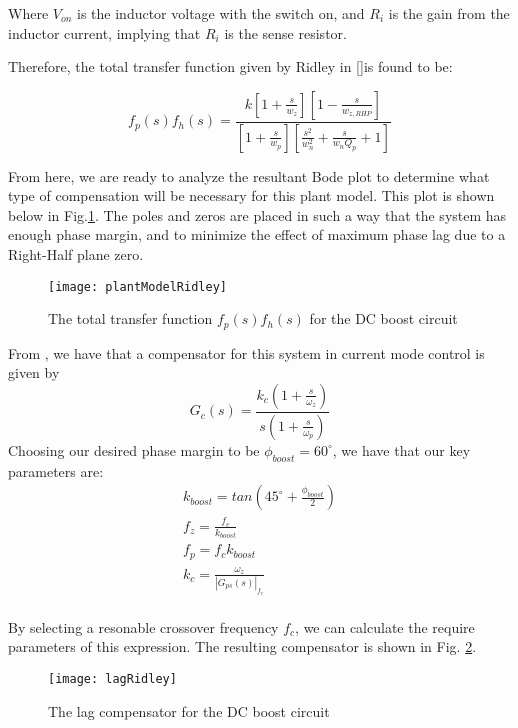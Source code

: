 Where $V_{on}$ is the inductor voltage with the switch on, and $R_i$ is the gain from the inductor current, implying that $R_i$ is the sense resistor.

Therefore, the total transfer function given by Ridley in [\cite{ridley}]is found to be:

\begin{equation}
\label{thirdOrder}
f_p(s)f_h(s)=\frac{k[1 + \frac{s}{w_z}][1 - \frac{s}{w_{z,RHP}}]}{[1 + \frac{s}{w_p}][\frac{s^2}{w_n^2} + \frac{s}{w_nQ_p} + 1]}
\end{equation}

From here, we are ready to analyze the resultant Bode plot to determine what type of compensation will be necessary for this plant model. This plot is shown below in Fig.\ref{plantModelRidley}.
The poles and zeros are placed in such a way that the system has enough phase margin, and to minimize the effect of maximum phase lag due to a Right-Half plane zero.

\begin{figure}[htbp]
\begin{center}
\texttt{[image: plantModelRidley]}
\caption{The total transfer function $f_p(s)f_h(s)$ for the DC boost circuit}
\label{plantModelRidley}
\end{center}
\end{figure}

From \cite{mohan}, we have that a compensator for this system in current mode control is given by
\begin{equation}
G_c(s) = \frac{k_c(1 + \frac{s}{\omega_z})}{s(1+\frac{s}{\omega_p})}
\end{equation}
Choosing our desired phase margin to be $\phi_{boost} = 60^{\circ}$, we have that our key parameters are:
\begin{gather*}
k_{boost} = tan(45^{\circ}+\frac{\phi_{boost}}{2})\\
f_z = \frac{f_c}{k_{boost}}\\
f_p = f_ck_{boost}\\
k_{c} = \frac{\omega_z}{|G_{ps}(s)|_{f_c}}\\
\end{gather*}

By selecting a resonable crossover frequency $f_c$, we can calculate the require parameters of this expression. The resulting compensator is shown in Fig. \ref{lagRidley}.

\begin{figure}[htbp]
\begin{center}
\texttt{[image: lagRidley]}
\caption{The lag compensator for the DC boost circuit}
\label{lagRidley}
\end{center}
\end{figure}

